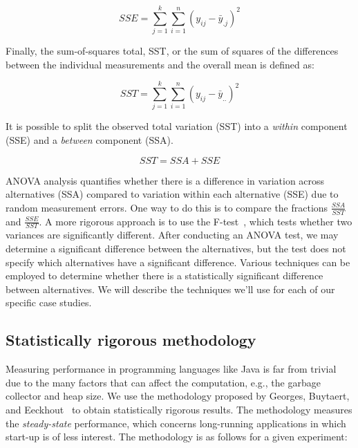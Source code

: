 \begin{equation}
    SSE = \sum_{j = 1}^{k}\sum_{i = 1}^{n} (y_{ij} - \bar{y}_{.j})^2
\end{equation}

Finally, the sum-of-squares total, SST, or the sum of squares of the differences between the individual measurements and the overall mean is defined as:

\begin{equation}
    SST = \sum_{j = 1}^{k}\sum_{i = 1}^{n} (y_{ij} - \bar{y}_{..})^2
\end{equation}

It is possible to split the observed total variation (SST) into a \emph{within} component (SSE) and a \emph{between} component (SSA).

\begin{equation}
    SST = SSA + SSE
\end{equation}

ANOVA analysis quantifies whether there is a difference in variation across alternatives (SSA) compared to variation within each alternative (SSE) due to random measurement errors. One way to do this is to compare the fractions \(\frac{SSA}{SST}\) and \(\frac{SSE}{SST}\). A more rigorous approach is to use the F-test~\cite{lilja2005measuring}, which tests whether two variances are significantly different.  After conducting an ANOVA test, we may determine a significant difference between the alternatives, but the test does not specify which alternatives have a significant difference. Various techniques can be employed to determine whether there is a statistically significant difference between alternatives. We will describe the techniques we'll use for each of our specific case studies.

\subsection{\label{subsec:stat-rigor-meth}Statistically rigorous methodology}

Measuring performance in programming languages like Java is far from trivial due to the many factors that can affect the computation, e.g., the garbage collector and heap size. We use the methodology proposed by Georges, Buytaert, and Eeckhout~\cite{DBLP_conf_oopsla_GeorgesBE07} to obtain statistically rigorous results. The methodology measures the \textit{steady-state} performance, which concerns long-running applications in which start-up is of less interest. The methodology is as follows for a given experiment:


